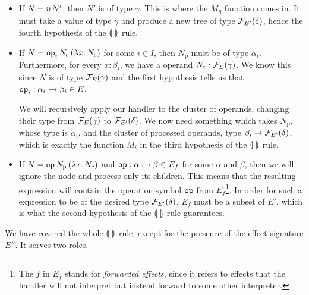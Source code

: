 \begin{itemize}
\item If $N = \eta\,N'$, then $N'$ is of type $\gamma$. This is where the
  $M_\eta$ function comes in. It must take a value of type $\gamma$ and
  produce a new tree of type $\mathcal{F}_{E'}(\delta)$, hence the fourth
  hypothesis of the $\llparenthesis \,  \, \rrparenthesis$ rule.

\item If $N = \mathtt{op}_i\,N_{\mathrm{c}}\,(\lambda x.\, N_{\mathrm{c}})$
  for some $i \in I$, then $N_{\mathrm{p}}$ must be of type
  $\alpha_i$. Furthermore, for every $x : \beta_i$, we have a operand
  $N_{\mathrm{c}} : \mathcal{F}_E(\gamma)$. We know this since $N$ is of type
  $\mathcal{F}_E(\gamma)$ and the first hypothesis tells us that
  $\mathtt{op}_i : \alpha_i \rightarrowtail \beta_i \in E$.

  We will recursively apply our handler to the cluster of operands,
  changing their type from $\mathcal{F}_E(\gamma)$ to $\mathcal{F}_{E'}(\delta)$. We now
  need something which takes $N_{\mathrm{p}}$, whose type is $\alpha_i$,
  and the cluster of processed operands, type
  $\beta_i \to \mathcal{F}_{E'}(\delta)$, which is exactly the function $M_i$ in
  the third hypothesis of the $\llparenthesis \,  \, \rrparenthesis$ rule.

\item If $N = \mathtt{op}\,N_{\mathrm{p}}\,(\lambda x.\, N_{\mathrm{c}})$ and
  $\mathtt{op} : \alpha \rightarrowtail \beta \in E_f$ for some $\alpha$ and $\beta$, then
  we will ignore the node and process only its children. This means that
  the resulting expression will contain the operation symbol $\mathtt{op}$ from
  $E_f$\footnote{The $f$ in $E_f$ stands for \emph{forwarded effects},
    since it refers to effects that the handler will not interpret but
    instead forward to some other interpreter.}. In order for such a
  expression to be of the desired type $\mathcal{F}_{E'}(\delta)$, $E_f$ must be a
  subset of $E'$, which is what the second hypothesis of the $\llparenthesis \,  \, \rrparenthesis$
  rule guarantees.
\end{itemize}

We have covered the whole $\llparenthesis \,  \, \rrparenthesis$ rule, except for the presence of the
effect signature $E''$. It serves two roles.

